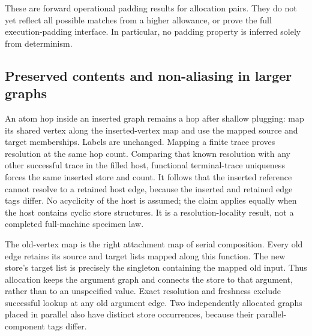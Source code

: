 These are forward operational padding results for allocation pairs. They do
not yet reflect all possible matches from a higher allowance, or prove the
full execution-padding interface. In particular, no padding property is
inferred solely from determinism.






\subsection{Preserved contents and non-aliasing in larger graphs}

An atom hop inside an inserted graph remains a hop after shallow plugging:
map its shared vertex along the inserted-vertex map and use the mapped source
and target memberships. Labels are unchanged. Mapping a finite trace proves
resolution at the same hop count. Comparing that known resolution with any
other successful trace in the filled host, functional terminal-trace uniqueness
forces the same inserted store and count. It follows that the inserted reference
cannot resolve to a retained host edge, because the inserted and retained edge
tags differ. No acyclicity of the host is assumed; the claim applies equally
when the host contains cyclic store structures. It is a resolution-locality
result, not a completed full-machine specimen law.





The old-vertex map is the right attachment map of serial composition.
Every old edge retains its source and target lists mapped along this function.
The new store's target list is precisely the singleton containing the mapped
old input. Thus allocation keeps the argument graph and connects the store
to that argument, rather than to an unspecified value. Exact resolution and
freshness exclude successful lookup at any old argument edge. Two independently
allocated graphs placed in parallel also have distinct store occurrences,
because their parallel-component tags differ.

